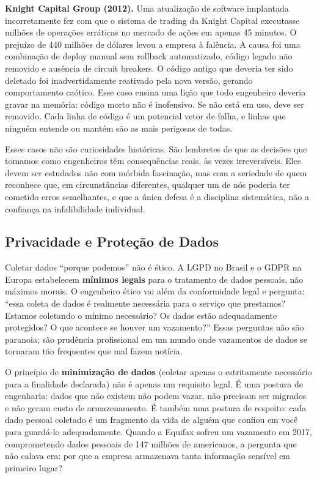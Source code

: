 \textbf{Knight Capital Group (2012).} Uma atualização de software
implantada incorretamente fez com que o sistema de trading da Knight
Capital executasse milhões de operações erráticas no mercado de ações em
apenas 45 minutos. O prejuízo de 440 milhões de dólares levou a empresa
à falência. A causa foi uma combinação de deploy manual sem rollback
automatizado, código legado não removido e ausência de circuit breakers.
O código antigo que deveria ter sido deletado foi inadvertidamente
reativado pela nova versão, gerando comportamento caótico. Esse caso
ensina uma lição que todo engenheiro deveria gravar na memória: código
morto não é inofensivo. Se não está em uso, deve ser removido. Cada
linha de código é um potencial vetor de falha, e linhas que ninguém
entende ou mantém são as mais perigosas de todas.

Esses casos não são curiosidades históricas. São lembretes de que as
decisões que tomamos como engenheiros têm consequências reais, às vezes
irreversíveis. Eles devem ser estudados não com mórbida fascinação, mas
com a seriedade de quem reconhece que, em circunstâncias diferentes,
qualquer um de nós poderia ter cometido erros semelhantes, e que a
única defesa é a disciplina sistemática, não a confiança na
infalibilidade individual.

\subsection{Privacidade e Proteção de Dados}

Coletar dados ``porque podemos'' não é ético. A LGPD no Brasil e o GDPR
na Europa estabelecem \textbf{mínimos legais} para o tratamento de dados
pessoais, não máximos morais. O engenheiro ético vai além da
conformidade legal e pergunta: ``essa coleta de dados é realmente
necessária para o serviço que prestamos? Estamos coletando o mínimo
necessário? Os dados estão adequadamente protegidos? O que acontece se
houver um vazamento?'' Essas perguntas não são paranoia; são prudência
profissional em um mundo onde vazamentos de dados se tornaram tão
frequentes que mal fazem notícia.

O princípio de \textbf{minimização de dados} (coletar apenas o
estritamente necessário para a finalidade declarada) não é apenas um
requisito legal. É uma postura de engenharia: dados que não existem não
podem vazar, não precisam ser migrados e não geram custo de armazenamento.
É também uma postura de respeito: cada dado pessoal coletado é um
fragmento da vida de alguém que confiou em você para guardá-lo
adequadamente. Quando a Equifax sofreu um vazamento em 2017,
comprometendo dados pessoais de 147 milhões de americanos, a pergunta
que não calava era: por que a empresa armazenava tanta informação
sensível em primeiro lugar?

